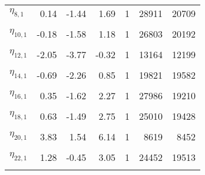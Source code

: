 \begin{longtable}[t]{lrrrrrr}
$\eta_{8,  1}$ & 0.14 & -1.44 & 1.69 & 1 & 28911 & 20709\\
\cellcolor{gray!6}{$\eta_{9,  1}$} & \cellcolor{gray!6}{-0.14} & \cellcolor{gray!6}{-2.74} & \cellcolor{gray!6}{2.28} & \cellcolor{gray!6}{1} & \cellcolor{gray!6}{26992} & \cellcolor{gray!6}{18502}\\
$\eta_{10,  1}$ & -0.18 & -1.58 & 1.18 & 1 & 26803 & 20192\\
\cellcolor{gray!6}{$\eta_{11,  1}$} & \cellcolor{gray!6}{-0.86} & \cellcolor{gray!6}{-2.22} & \cellcolor{gray!6}{0.50} & \cellcolor{gray!6}{1} & \cellcolor{gray!6}{22292} & \cellcolor{gray!6}{20113}\\
$\eta_{12,  1}$ & -2.05 & -3.77 & -0.32 & 1 & 13164 & 12199\\
\cellcolor{gray!6}{$\eta_{13,  1}$} & \cellcolor{gray!6}{1.11} & \cellcolor{gray!6}{-0.30} & \cellcolor{gray!6}{2.57} & \cellcolor{gray!6}{1} & \cellcolor{gray!6}{24740} & \cellcolor{gray!6}{19483}\\
$\eta_{14,  1}$ & -0.69 & -2.26 & 0.85 & 1 & 19821 & 19582\\
\cellcolor{gray!6}{$\eta_{15,  1}$} & \cellcolor{gray!6}{0.33} & \cellcolor{gray!6}{-1.95} & \cellcolor{gray!6}{2.53} & \cellcolor{gray!6}{1} & \cellcolor{gray!6}{26349} & \cellcolor{gray!6}{19536}\\
$\eta_{16,  1}$ & 0.35 & -1.62 & 2.27 & 1 & 27986 & 19210\\
\cellcolor{gray!6}{$\eta_{17,  1}$} & \cellcolor{gray!6}{1.23} & \cellcolor{gray!6}{-0.42} & \cellcolor{gray!6}{2.94} & \cellcolor{gray!6}{1} & \cellcolor{gray!6}{28949} & \cellcolor{gray!6}{19136}\\
$\eta_{18,  1}$ & 0.63 & -1.49 & 2.75 & 1 & 25010 & 19428\\
\cellcolor{gray!6}{$\eta_{19,  1}$} & \cellcolor{gray!6}{1.74} & \cellcolor{gray!6}{0.11} & \cellcolor{gray!6}{3.42} & \cellcolor{gray!6}{1} & \cellcolor{gray!6}{18872} & \cellcolor{gray!6}{19508}\\
$\eta_{20,  1}$ & 3.83 & 1.54 & 6.14 & 1 & 8619 & 8452\\
\cellcolor{gray!6}{$\eta_{21,  1}$} & \cellcolor{gray!6}{-0.04} & \cellcolor{gray!6}{-2.05} & \cellcolor{gray!6}{1.90} & \cellcolor{gray!6}{1} & \cellcolor{gray!6}{25837} & \cellcolor{gray!6}{18119}\\
$\eta_{22,  1}$ & 1.28 & -0.45 & 3.05 & 1 & 24452 & 19513\\
\cellcolor{gray!6}{$\eta_{23,  1}$} & \cellcolor{gray!6}{1.39} & \cellcolor{gray!6}{-0.52} & \cellcolor{gray!6}{3.40} & \cellcolor{gray!6}{1} & \cellcolor{gray!6}{22193} & \cellcolor{gray!6}{19337}\\

\end{longtable}
